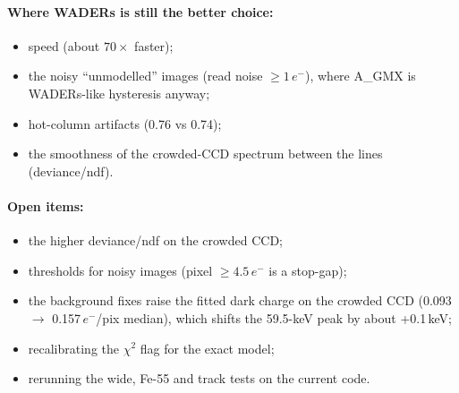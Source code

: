 \documentclass[10pt,a4paper]{article}
\newcommand{\el}{\ensuremath{e^-}}
\newcommand{\AGMX}{A\_GMX}
\begin{document}
\paragraph{Where WADERs is still the better choice:}
\begin{itemize}
\item speed (about $70\times$ faster);
\item the noisy ``unmodelled'' images (read noise $\ge1$\,\el), where \AGMX{} is WADERs-like hysteresis anyway;
\item hot-column artifacts (0.76 vs 0.74);
\item the smoothness of the crowded-CCD spectrum between the lines (deviance/ndf).
\end{itemize}

\paragraph{Open items:}
\begin{itemize}
\item the higher deviance/ndf on the crowded CCD;
\item thresholds for noisy images (pixel $\ge4.5$\,\el{} is a stop-gap);
\item the background fixes raise the fitted dark charge on the crowded CCD (0.093 $\to$ 0.157\,\el/pix median),
which shifts the 59.5-keV peak by about +0.1\,keV;
\item recalibrating the $\chi^2$ flag for the exact model;
\item rerunning the wide, Fe-55 and track tests on the current code.
\end{itemize}
\end{document}
